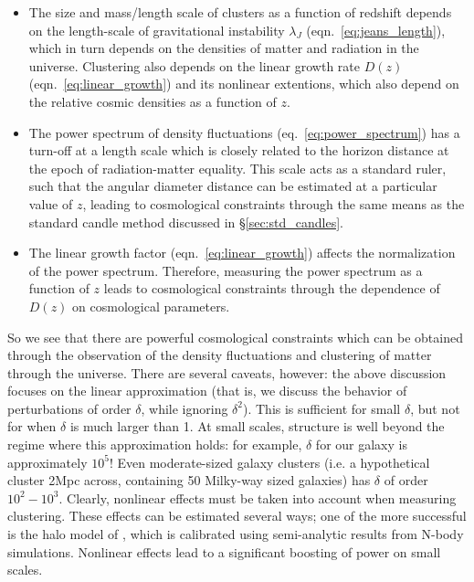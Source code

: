 \begin{itemize}
  \item The size and mass/length scale of clusters as a function of redshift
    depends on the length-scale of gravitational instability $\lambda_J$
    (eqn.~\ref{eq:jeans_length}),
    which in turn depends on the densities of matter and radiation in the
    universe.  Clustering also depends on the linear growth rate
    $D(z)$ (eqn.~\ref{eq:linear_growth}) and its nonlinear extentions,
    which also depend on the relative cosmic densities as a function of $z$.
  \item The power spectrum of density fluctuations (eq.~\ref{eq:power_spectrum})
    has a turn-off at
    a length scale which is closely related to the horizon distance
    at the epoch of radiation-matter equality.  This scale acts as a standard
    ruler, such that the angular diameter distance can be estimated at a
    particular value of $z$, leading to cosmological constraints through the
    same means as the standard candle method discussed in
    \S\ref{sec:std_candles}.
  \item The linear growth factor (eqn.~\ref{eq:linear_growth}) affects the
    normalization of the power spectrum.  Therefore, measuring the power
    spectrum as a function of $z$ leads to cosmological constraints
    through the dependence of $D(z)$ on cosmological parameters.
\end{itemize}

So we see that there are powerful cosmological constraints which can be
obtained through the observation of the density fluctuations and clustering
of matter through the universe.  There are several caveats, however:
the above discussion focuses on the linear approximation (that is, we
discuss the behavior of perturbations of order $\delta$, while ignoring
$\delta^2$).  This is sufficient for small $\delta$, but not for when
$\delta$ is much larger than 1.  At small scales, structure is well beyond
the regime where this approximation holds: for example, $\delta$ for our
galaxy is approximately $10^5$!  Even moderate-sized galaxy clusters
(i.e. a hypothetical cluster 2Mpc across, containing 50 Milky-way
sized galaxies) has $\delta$ of order $10^2-10^3$.  Clearly, nonlinear
effects must be taken into account when measuring clustering.  These
effects can be estimated several ways; one of the more successful is the
halo model of \citet{Smith03}, which is calibrated using semi-analytic
results from N-body simulations.  Nonlinear effects lead to a significant
boosting of power on small scales.

